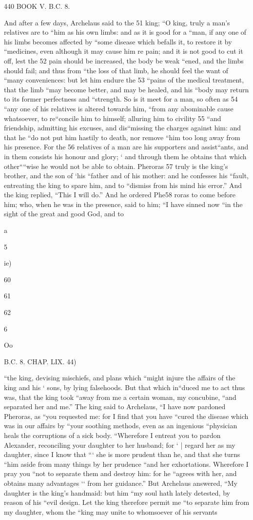 440 BOOK V. B.C. 8. 

And after a few days, Archelaus said to the 51 king; “O king, truly a man’s relatives are to “him as his own limbs: and as it is good for a “man, if any one of his limbs becomes affected by “some disease which befalls it, to restore it by “medicines, even although it may cause him re pain; and it is not good to cut it off, lest the 52 pain should be increased, the body be weak
“ened, and the limbs should fail; and thus from “the loss of that limb, he should feel the want of “many conveniences: but let him endure the 53 “pains of the medical treatment, that the limb “may become better, and may be healed, and his “body may return to its former perfectness and “strength. So is it meet for a man, so often as 54 “any one of his relatives is altered towards him, “from any abominable cause whatsoever, to re“concile him to himself; alluring him to civility 55 “and friendship, admitting his excuses, and dis“missing the charges against him: and that he “do not put him hastily to death, nor remove “him too long away from his presence. For the 56 relatives of a man are his supporters and assist“ants, and in them consists his honour and glory; ‘ and through them he obtains that which other““wise he would not be able to obtain. Pheroras 57 truly is the king’s brother, and the son of ‘his “father and of his mother: and he confesses his “fault, entreating the king to spare him, and to “dismiss from his mind his error.” And the king replied, “This I will do.” And he ordered Phe58 roras to come before him; who, when he was in the presence, said to him; “I have sinned now “in the sight of the great and good God, and to 

a 

5 

ie) 

60 

61 

62 

6 

Oo 

B.C. 8. CHAP. LIX. 44) 

“the king, devising mischiefs, and plans which “might injure the affairs of the king and his ‘ sons, by lying falsehoods. But that which in“duced me to act thus was, that the king took “away from me a certain woman, my concubine, “and separated her and me.” The king said to Archelaus, “I have now pardoned Pheroras, as “you requested me: for I find that you have “cured the disease which was in our affairs by “your soothing methods, even as an ingenious “physician heals the corruptions of a sick body. “Wherefore I entreat you to pardon Alexander, reconciling your daughter to her husband; for ‘ | regard her as my daughter, since I know that “‘ she is more prudent than he, and that she turns “him aside from many things by her prudence “and her exhortations. Wherefore I pray you “not to separate them and destroy him: for he “agrees with her, and obtains many advantages ‘‘ from her guidance.” But Archelaus answered, “My daughter is the king’s handmaid: but him “my soul hath lately detested, by reason of his “evil design. Let the king therefore permit me “to separate him from my daughter, whom the “king may unite to whomsoever of his servants 

